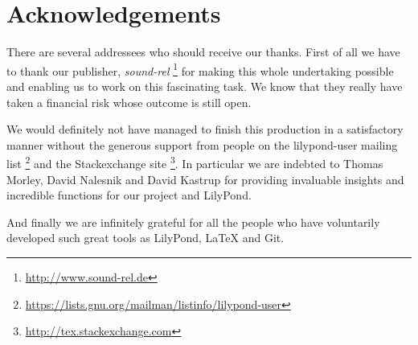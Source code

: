 \documentclass[11pt,a4paper]{article}
\begin{document}
\section{Acknowledgements}

There are several addressees who should receive our thanks. First of all we have to thank our publisher, \emph{sound-rel}%
\footnote{\url{http://www.sound-rel.de}} for making this whole undertaking possible and
enabling us to work on this fascinating task. We know that they really have taken a financial
risk whose outcome is still open.

We would definitely not have managed to finish this production in a satisfactory manner
without the generous support from people on the lilypond-user mailing list%
\footnote{\url{https://lists.gnu.org/mailman/listinfo/lilypond-user}}
and the Stackexchange site%
\footnote{\url{http://tex.stackexchange.com}}. In particular we are indebted to
Thomas Morley, David Nalesnik and David Kastrup for providing invaluable insights and
incredible functions for our project and LilyPond.

And finally we are infinitely grateful for all the people who have voluntarily developed
such great tools as LilyPond, \LaTeX{} and Git.
\end{document}
